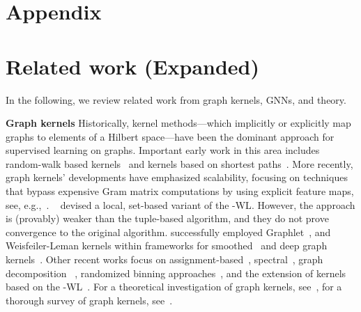 \documentclass{article}
\newcommand{\xhdr}[1]{{\noindent\bfseries #1}}
\theoremstyle{definition}
\newcommand{\wl}{-\textsf{WL}\xspace}
\newcommand{\kwl}{-\textsf{WL}\xspace}
\begin{document}
\newpage
\appendix
\section*{Appendix}

\section{Related work (Expanded)}\label{exprel}

In the following, we review related work from graph kernels, GNNs, and theory.

\xhdr{Graph kernels}
Historically, kernel methods---which implicitly or explicitly map graphs to elements of a Hilbert space---have been the dominant approach for supervised learning on graphs. Important early work in this area includes random-walk based kernels~\cite{Gae+2003,Kas+2003,Kri+2017b} and kernels based on shortest paths~\cite{Bor+2005}. More recently, graph kernels' developments have emphasized scalability, focusing on techniques that bypass expensive Gram matrix computations by using explicit feature maps, see, e.g.,~\cite{She+2011}. \citeauthor{Mor+2017}~\cite{Mor+2017} devised a local, set-based variant of the \kwl. However, the approach is (provably) weaker than the tuple-based algorithm, and they do not prove convergence to the original algorithm. \citeauthor{Yan+2015} successfully employed Graphlet~\cite{She+2009}, and Weisfeiler-Leman kernels within frameworks for smoothed~\cite{Yan+2015} and deep graph kernels~\cite{Yan+2015a}. Other recent works focus on assignment-based~\cite{Joh+2015,Kri+2016,Nik+2017}, spectral~\cite{Kon+2016,Ver+2017}, graph decomposition ~\cite{Nik+2018}, randomized binning approaches~\cite{Hei+2019}, and the extension of kernels based on the \wl~\cite{Rie+2019,Tog+2019}. For a theoretical investigation of graph kernels, see~\cite{Kri+2018}, for a thorough survey of graph kernels, see~\cite{Kri+2019}. 
\end{document}
